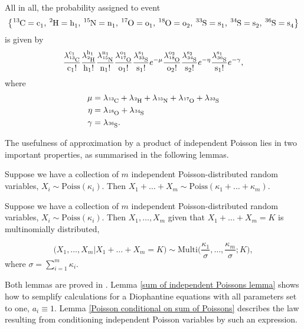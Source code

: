 All in all, the probability assigned to event
\begin{equation*}
 	\left\{ \cem{^{13}C} = \cem{c_1},\, \cem{^{2}H} = \cem{h_1},\, \cem{^{15}N} = \cem{n_1},\, \cem{^{17}O} = \cem{o_1},\, \cem{^{18}O} = \cem{o_2},\, \cem{^{33}S} = \cem{s_1},\, \cem{^{34}S} = \cem{s_2},\, \cem{^{36}S}= \cem{s_4} \right\}	
\end{equation*} 
is given by
\begin{equation}\label{QK Nominator}
	\poiss{\text{c}}{13}{1}
	\poiss{\text{h}}{2}{1}
	\poiss{\text{n}}{15}{1}
	\poiss{\text{o}}{17}{1}
	\poiss{\text{s}}{33}{1}
		e^{ - \mu}
	\poiss{\text{o}}{18}{2}	
	\poiss{\text{s}}{34}{2}
		e^{ - \eta }		
	\poiss{\text{s}}{36}{1}
		e^{ - \gamma },
\end{equation}
where 
\begin{align*}\label{intensities summed equation}
	\mu 	&=	\lambda_\cem{^{13}C} + \lambda_\cem{^{2}H} + \lambda_\cem{^{15}N} + \lambda_\cem{^{17}O} +\lambda_\cem{^{33}S}  	\\
	\eta 	&= 	\lambda_\cem{^{18}O} + \lambda_\cem{^{34}S}\\ 
	\gamma	&= 	\lambda_\cem{^{36}S}.
\end{align*}

The usefulness of approximation by a product of independent Poisson lies in two important properties, as summarised in the following lemmas.

\begin{lemma}\label{sum of independent Poissons lemma}
	Suppose we have a collection of $m$ independent Poisson-distributed random variables, $X_i \sim \mathrm{Poiss}(\kappa_i)$. Then $X_1 + \dots + X_m \sim \mathrm{Poiss}(\kappa_1 + \dots + \kappa_m)$. 
\end{lemma}  

\begin{lemma}\label{Poisson conditional on sum of Poissons}
	Suppose we have a collection of $m$ independent Poisson-distributed random variables, $X_i \sim \mathrm{Poiss}(\kappa_i)$. Then $X_1, \dots, X_m$ given that $X_1 + \dots + X_m = K$ is multinomially distributed,

$$ 
	\Big(X_1, \dots, X_m | X_1 + \dots + X_m = K \Big) 
	\sim 
	\mathrm{Multi}\Big( \frac{\kappa_1}{\sigma}, \dots, \frac{\kappa_m}{\sigma}; K \Big), 
$$
	where $\sigma = \sum_{i = 1}^m \kappa_i$.	
\end{lemma}
Both lemmas are proved in \cite{Kingman1993PoissonProcesses}. Lemma \ref{sum of independent Poissons lemma} shows how to semplify calculations for a Diophantine equations with all parameters set to one, $a_i \equiv 1$. Lemma \ref{Poisson conditional on sum of Poissons} describes the law resulting from conditioning independent Poisson variables by such an expression. 

